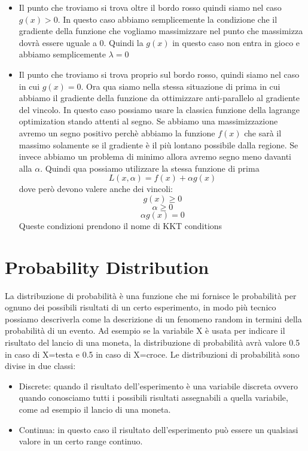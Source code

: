 \documentclass[14pt]{extreport}
\begin{document}
\begin{itemize}

\item Il punto che troviamo si trova oltre il bordo rosso quindi siamo nel caso $g(x) > 0$. In questo caso abbiamo semplicemente la condizione che il
gradiente della funzione che vogliamo massimizzare nel punto che massimizza dovrà essere uguale a 0. Quindi la $g(x)$ in questo caso non entra in
gioco e abbiamo semplicemente $\lambda = 0$
\item Il punto che troviamo si trova proprio sul bordo rosso, quindi siamo nel caso in cui $g(x) = 0$. Ora qua siamo nella stessa situazione di prima
in cui abbiamo il gradiente della funzione da ottimizzare anti-parallelo al gradiente del vincolo. In questo caso possiamo usare la classica funzione
della lagrange optimization stando attenti al segno. Se abbiamo una massimizzazione avremo un segno positivo perchè abbiamo la funzione $f(x)$ che
sarà il massimo solamente se il gradiente è il più lontano possibile dalla regione. Se invece abbiamo un problema di minimo allora avremo segno meno
davanti alla $\alpha$. Quindi qua possiamo utilizzare la stessa funzione di prima $$L(x, \alpha) = f(x) + \alpha g(x)$$ dove però devono valere anche
dei vincoli: $$g(x) \geq 0$$ $$\alpha \geq 0$$ $$\alpha g(x) = 0$$ Queste condizioni prendono il nome di KKT conditions
\end{itemize}


\section{Probability Distribution}

La distribuzione di probabilità è una funzione che mi fornisce le probabilità per ognuno dei possibili risultati di un certo esperimento, in modo più
tecnico possiamo descriverla come la descrizione di un fenomeno random in termini della probabilità di un evento. Ad esempio se la variabile X è usata
per indicare il risultato del lancio di una moneta, la distribuzione di probabilità avrà valore 0.5 in caso di X=testa e 0.5 in caso di X=croce. Le
distribuzioni di probabilità sono divise in due classi:
\begin{itemize}
\item Discrete: quando il risultato dell'esperimento è una variabile discreta ovvero quando conosciamo tutti i possibili risultati assegnabili a
quella variabile, come ad esempio il lancio di una moneta.
\item Continua: in questo caso il risultato dell'esperimento può essere un qualsiasi valore in un certo range continuo.
\end{itemize}
\end{document}

